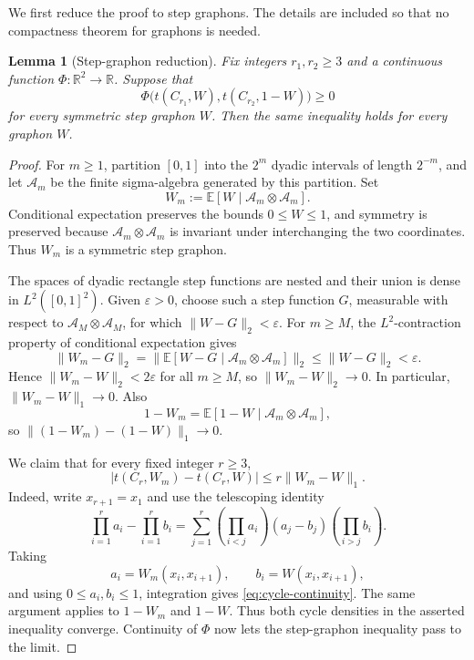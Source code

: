 \documentclass[11pt]{article}
\newtheorem{lemma}[theorem]{Lemma}
\theoremstyle{definition}
\theoremstyle{remark}
\newcommand{\R}{\mathbb{R}}
\begin{document}
We first reduce the proof to step graphons.  The details are included so that no
compactness theorem for graphons is needed.

\begin{lemma}[Step-graphon reduction]
  \label{lem:step-reduction}
  Fix integers $r_1,r_2\ge3$ and a continuous function
  $\Phi\colon\R^2\to\R$.  Suppose that
  \[
    \Phi\bigl(t(C_{r_1},W),t(C_{r_2},1-W)\bigr)\ge0
  \]
  for every symmetric step graphon $W$.  Then the same inequality holds for
  every graphon $W$.
\end{lemma}

\begin{proof}
  For $m\ge1$, partition $[0,1]$ into the $2^m$ dyadic intervals of length
  $2^{-m}$, and let $\mathcal A_m$ be the finite sigma-algebra generated by
  this partition.  Set
  \[
    W_m:=\mathbb E[W\mid \mathcal A_m\otimes\mathcal A_m].
  \]
  Conditional expectation preserves the bounds $0\le W\le1$, and symmetry is
  preserved because $\mathcal A_m\otimes\mathcal A_m$ is invariant under
  interchanging the two coordinates.  Thus $W_m$ is a symmetric step graphon.

  The spaces of dyadic rectangle step functions are nested and their union is
  dense in $L^2([0,1]^2)$.  Given $\varepsilon>0$, choose such a step function
  $G$, measurable with respect to $\mathcal A_M\otimes\mathcal A_M$, for which
  $\|W-G\|_2<\varepsilon$.  For $m\ge M$, the $L^2$-contraction property of
  conditional expectation gives
  \[
    \|W_m-G\|_2
    =\|\mathbb E[W-G\mid\mathcal A_m\otimes\mathcal A_m]\|_2
    \le\|W-G\|_2<\varepsilon.
  \]
  Hence $\|W_m-W\|_2<2\varepsilon$ for all $m\ge M$, so
  $\|W_m-W\|_2\to0$.  In particular, $\|W_m-W\|_1\to0$.  Also
  \[
    1-W_m
    =\mathbb E[1-W\mid\mathcal A_m\otimes\mathcal A_m],
  \]
  so $\|(1-W_m)-(1-W)\|_1\to0$.

  We claim that for every fixed integer $r\ge3$,
  \begin{equation}
    |t(C_r,W_m)-t(C_r,W)|
    \le r\|W_m-W\|_1.
    \label{eq:cycle-continuity}
  \end{equation}
  Indeed, write $x_{r+1}=x_1$ and use the telescoping identity
  \[
    \prod_{i=1}^r a_i-\prod_{i=1}^r b_i
    =
    \sum_{j=1}^r
    \left(\prod_{i<j}a_i\right)(a_j-b_j)
    \left(\prod_{i>j}b_i\right).
  \]
  Taking
  \[
    a_i=W_m(x_i,x_{i+1}),
    \qquad
    b_i=W(x_i,x_{i+1}),
  \]
  and using $0\le a_i,b_i\le1$, integration gives
  \eqref{eq:cycle-continuity}.  The same argument applies to $1-W_m$ and
  $1-W$.  Thus both cycle densities in the asserted inequality converge.
  Continuity of $\Phi$ now lets the step-graphon inequality pass to the limit.
\end{proof}
\end{document}
